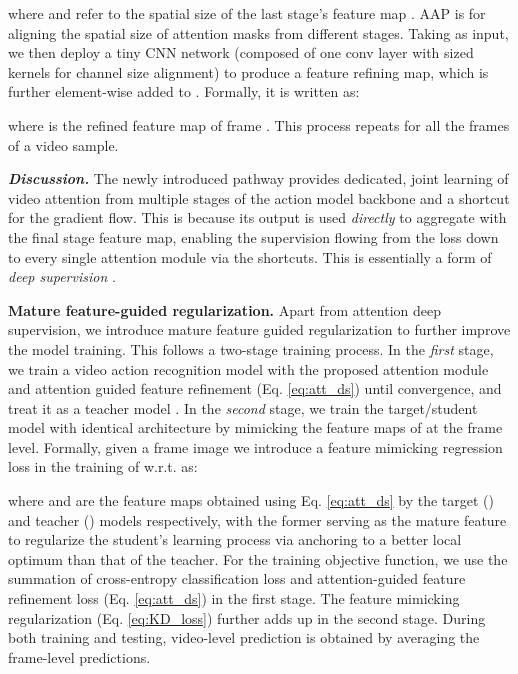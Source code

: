 \documentclass[runningheads]{llncs}
\newcommand{\keypoint}[1]{\vspace{0.1cm}\noindent\textbf{#1}\quad}
\begin{document}
where  and  refer to the spatial size of the last stage's feature map .
AAP is for aligning the spatial size of attention masks
from different stages.
Taking  as input, we then deploy a tiny CNN network  (composed of one conv layer with   sized kernels for channel size alignment) to produce a feature refining map,
which is further element-wise added to . Formally, it is written as: 

where  is the refined feature map of frame .
This process repeats for all the frames of a video sample. 

\textbf{\em Discussion. }
The newly introduced pathway provides
dedicated, joint learning of video attention from multiple stages of the action model backbone and  a shortcut for the gradient flow.
This is because its output is used {\em directly} to aggregate with the final stage feature map, enabling the supervision flowing from the loss down to every single attention module via the shortcuts.
This is essentially a form of  {\em deep supervision} \cite{chang2018multi,lee2015deeply}.



\keypoint{Mature feature-guided regularization.}
Apart from attention deep supervision, we introduce
mature feature guided regularization to further improve the model training.
This follows a two-stage training process.
In the {\em first} stage, we train a video action recognition model with the proposed attention module and attention guided feature refinement (Eq. \eqref{eq:att_ds})
until convergence, and treat it as a teacher model .
In the {\em second} stage, we train the target/student model  with identical architecture by mimicking the feature maps
of  at the frame level.
Formally, given a frame image  we introduce a feature mimicking regression loss
in the training of  w.r.t.  as:

where  and  are the feature maps
obtained using Eq. \eqref{eq:att_ds} by the target () and teacher () models respectively, with the former serving as the
mature feature to regularize the student's learning process via anchoring to  
a better local optimum than that of the teacher. For the training objective function, we use the summation of cross-entropy classification loss and attention-guided feature refinement loss (Eq. \eqref{eq:att_ds}) in the first stage. The feature mimicking regularization (Eq. \eqref{eq:KD_loss}) further adds up in the second stage. During both training and testing, video-level prediction is obtained by averaging the frame-level predictions.
\end{document}
